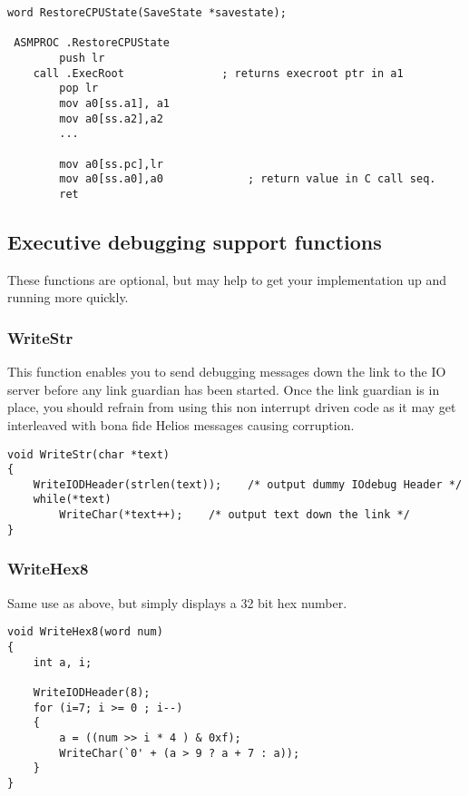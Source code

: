 \begin{enumerate}
\scriptsize
\begin{verbatim}
word RestoreCPUState(SaveState *savestate);

 ASMPROC .RestoreCPUState
        push lr
    call .ExecRoot               ; returns execroot ptr in a1
        pop lr
        mov a0[ss.a1], a1
        mov a0[ss.a2],a2
        ...

        mov a0[ss.pc],lr
        mov a0[ss.a0],a0             ; return value in C call seq.
        ret
\end{verbatim}
\normalsize
\end{enumerate}

\subsection{Executive debugging support functions}

These functions are optional, but may help to get your implementation up and
running more quickly.

\subsubsection{WriteStr}

This function enables you to send debugging messages down the link to
the IO server before any link guardian has been started.
Once the link guardian is in place, you should refrain from using
this non interrupt driven code as it may get interleaved with bona fide
Helios messages causing corruption.
\scriptsize
\begin{verbatim}
void WriteStr(char *text)
{
    WriteIODHeader(strlen(text));    /* output dummy IOdebug Header */
    while(*text)
        WriteChar(*text++);    /* output text down the link */
}
\end{verbatim}
\normalsize

\subsubsection{WriteHex8}

Same use as above, but simply displays a 32 bit hex number.
\scriptsize
\begin{verbatim}
void WriteHex8(word num)
{
    int a, i;

    WriteIODHeader(8);
    for (i=7; i >= 0 ; i--)
    {
        a = ((num >> i * 4 ) & 0xf);
        WriteChar(`0' + (a > 9 ? a + 7 : a));
    }
}
\end{verbatim}
\normalsize

